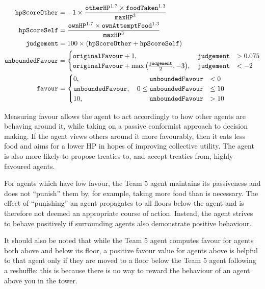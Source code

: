 \begin{align*}
    \texttt{hpScoreOther} &= -1 \times \frac{\texttt{otherHP}^{1.7} \times \texttt{foodTaken}^{1.3}}{\texttt{maxHP}^3}\\
    \texttt{hpScoreSelf} &= \frac{\texttt{ownHP}^{1.7}\times\texttt{ownAttemptFood}^{1.3}}{\texttt{maxHP}^3}\\
    \texttt{judgement} &= 100 \times (\texttt{hpScoreOther} + \texttt{hpScoreSelf})\\
    \texttt{unboundedFavour} &= \begin{cases}
        \texttt{originalFavour} + 1, \quad\hfill \texttt{judgement} &> 0.075\\
        \texttt{originalFavour} + \max{\left(\frac{\texttt{judgement}}{2}, -3\right)}, \quad\hfill\texttt{judgement} &< -2
    \end{cases}\\
    \texttt{favour} &= \begin{cases}
        0, \quad\hfill \texttt{unboundedFavour} &< 0\\
        \texttt{unboundedFavour}, \quad 0 \leq \texttt{unboundedFavour} &\leq 10\\
        10, \quad\hfill \texttt{unboundedFavour} &> 10
    \end{cases}\\
\end{align*}

Measuring favour allows the agent to act accordingly to how other agents are behaving around it, while taking on a passive conformist approach to decision making. If the agent views others around it more favourably, then it eats less food and aims for a lower HP in hopes of improving collective utility. The agent is also more likely to propose treaties to, and accept treaties from, highly favoured agents.

For agents which have low favour, the Team 5 agent maintains its passiveness and does not ``punish'' them by, for example, taking more food than is necessary. The effect of ``punishing'' an agent propagates to all floors below the agent and is therefore not deemed an appropriate course of action. Instead, the agent strives to behave positively if surrounding agents also demonstrate positive behaviour.

It should also be noted that while the Team 5 agent computes favour for agents both above and below its floor, a positive favour value for agents above is helpful to that agent only if they are moved to a floor below the Team 5 agent following a reshuffle: this is because there is no way to reward the behaviour of an agent above you in the tower.









